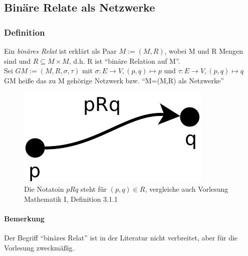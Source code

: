 \subsection{Binäre Relate als Netzwerke}
\subsubsection{Definition}
Ein \emph{binäres Relat} ist erklärt als Paar $M:=(M,R)$, wobei M und R Mengen sind und
$ {R} \subseteq {M \times M }$, d.h. R ist ``binäre Relation auf M''.
\\Sei $GM := (M,R,\sigma,\tau)$ mit $\sigma : E \rightarrow V, (p,q) \mapsto p$ und $\tau : E \rightarrow V, (p,q) \mapsto q$
\\GM heiße das zu M gehörige Netzwerk bzw.  ``M=(M,R) als Netzwerke''

\begin{figure}
 \centering
 \includegraphics[scale=0.7]{../bilder/binaere_relation.pdf}
 \caption{Die Notatoin $pRq$ steht für $(p,q) \in R$, vergleiche auch Vorlesung Mathematik I, Definition 3.1.1 }
\end{figure}


\paragraph{Bemerkung}
Der Begriff ``binäres Relat'' ist in der Literatur nicht verbreitet, aber für die Vorlesung zweckmäßig.